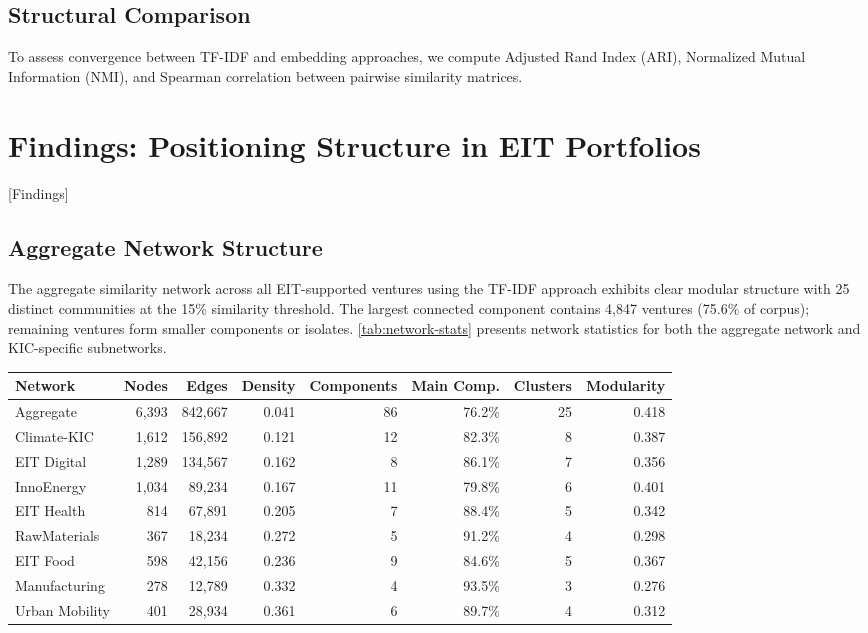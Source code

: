 \documentclass[../main.tex]{subfiles}
\begin{document}
\subsection{Structural Comparison}

To assess convergence between TF-IDF and embedding approaches, we compute Adjusted Rand Index (ARI), Normalized Mutual Information (NMI), and Spearman correlation between pairwise similarity matrices.

\section{Findings: Positioning Structure in EIT Portfolios}[Findings]

\subsection{Aggregate Network Structure}

The aggregate similarity network across all EIT-supported ventures using the TF-IDF approach exhibits clear modular structure with 25 distinct communities at the 15\% similarity threshold. The largest connected component contains 4,847 ventures (75.6\% of corpus); remaining ventures form smaller components or isolates. \cref{tab:network-stats} presents network statistics for both the aggregate network and KIC-specific subnetworks.

\begin{center}
\small
\begin{tabular}{lrrrrrrr}
\toprule
\textbf{Network} & \textbf{Nodes} & \textbf{Edges} & \textbf{Density} & \textbf{Components} & \textbf{Main Comp.} & \textbf{Clusters} & \textbf{Modularity} \\
\midrule
Aggregate & 6,393 & 842,667 & 0.041 & 86 & 76.2\% & 25 & 0.418 \\
\midrule
Climate-KIC & 1,612 & 156,892 & 0.121 & 12 & 82.3\% & 8 & 0.387 \\
EIT Digital & 1,289 & 134,567 & 0.162 & 8 & 86.1\% & 7 & 0.356 \\
InnoEnergy & 1,034 & 89,234 & 0.167 & 11 & 79.8\% & 6 & 0.401 \\
EIT Health & 814 & 67,891 & 0.205 & 7 & 88.4\% & 5 & 0.342 \\
RawMaterials & 367 & 18,234 & 0.272 & 5 & 91.2\% & 4 & 0.298 \\
EIT Food & 598 & 42,156 & 0.236 & 9 & 84.6\% & 5 & 0.367 \\
Manufacturing & 278 & 12,789 & 0.332 & 4 & 93.5\% & 3 & 0.276 \\
Urban Mobility & 401 & 28,934 & 0.361 & 6 & 89.7\% & 4 & 0.312 \\
\bottomrule
\end{tabular}
\end{center}
\end{document}
